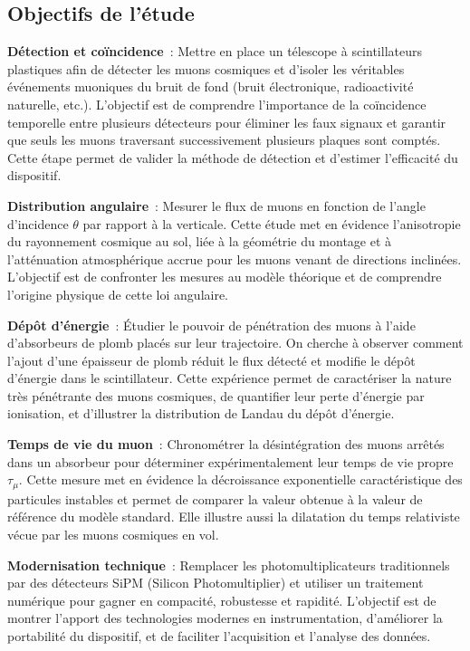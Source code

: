 \documentclass[a4paper,12pt,twoside]{article}
\begin{document}
\subsection{Objectifs de l’étude}

\textbf{Détection et coïncidence}~: Mettre en place un télescope à scintillateurs plastiques afin de détecter les muons cosmiques et d’isoler les véritables événements muoniques du bruit de fond (bruit électronique, radioactivité naturelle, etc.). L’objectif est de comprendre l’importance de la coïncidence temporelle entre plusieurs détecteurs pour éliminer les faux signaux et garantir que seuls les muons traversant successivement plusieurs plaques sont comptés. Cette étape permet de valider la méthode de détection et d’estimer l’efficacité du dispositif.

\textbf{Distribution angulaire}~: Mesurer le flux de muons en fonction de l’angle d’incidence $\theta$ par rapport à la verticale. Cette étude met en évidence l’anisotropie du rayonnement cosmique au sol, liée à la géométrie du montage et à l’atténuation atmosphérique accrue pour les muons venant de directions inclinées. L’objectif est de confronter les mesures au modèle théorique et de comprendre l’origine physique de cette loi angulaire.

\textbf{Dépôt d’énergie}~: Étudier le pouvoir de pénétration des muons à l’aide d’absorbeurs de plomb placés sur leur trajectoire. On cherche à observer comment l’ajout d’une épaisseur de plomb réduit le flux détecté et modifie le dépôt d’énergie dans le scintillateur. Cette expérience permet de caractériser la nature très pénétrante des muons cosmiques, de quantifier leur perte d’énergie par ionisation, et d’illustrer la distribution de Landau du dépôt d’énergie.

\textbf{Temps de vie du muon}~: Chronométrer la désintégration des muons arrêtés dans un absorbeur pour déterminer expérimentalement leur temps de vie propre $\tau_\mu$. Cette mesure met en évidence la décroissance exponentielle caractéristique des particules instables et permet de comparer la valeur obtenue à la valeur de référence du modèle standard. Elle illustre aussi la dilatation du temps relativiste vécue par les muons cosmiques en vol.

\textbf{Modernisation technique}~: Remplacer les photomultiplicateurs traditionnels par des détecteurs SiPM (Silicon Photomultiplier) et utiliser un traitement numérique pour gagner en compacité, robustesse et rapidité. L’objectif est de montrer l’apport des technologies modernes en instrumentation, d’améliorer la portabilité du dispositif, et de faciliter l’acquisition et l’analyse des données.
\end{document}
